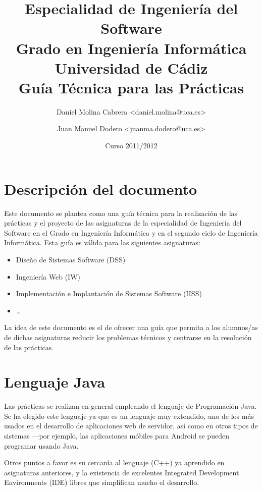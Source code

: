 \documentclass[11pt]{article}
\title{Especialidad de Ingeniería del Software\\
Grado en Ingeniería Informática\\
Universidad de Cádiz\\
\textbf{Guía Técnica para las Prácticas}}
\author{Daniel Molina Cabrera <daniel.molina@uca.es> \and Juan Manuel Dodero <juanma.dodero@uca.es>}
\date{Curso 2011/2012}
\begin{document}
\maketitle


\setcounter{tocdepth}{2}
\tableofcontents
\vspace*{1cm}
\newpage
\setlength{\parindent}{0pt}
\setlength{\parskip}{1ex plus 0.5ex minus 0.2ex}


\section{Descripción del documento}
\label{sec-1}




Este documento se plantea como una guía técnica para la realización de las prácticas y el proyecto de las asignaturas de la especialidad de Ingeniería del Software en el Grado en Ingeniería Informática y en el segundo ciclo de Ingeniería Informática. Esta guía es válida para las siguientes asignaturas:

\begin{itemize}
   \item Diseño de Sistemas Software (DSS)
   \item Ingeniería Web (IW)
   \item Implementación e Implantación de Sistemas Software (IISS)
   \item \ldots
\end{itemize}

La idea de este documento es el de ofrecer una guía que permita a los alumnos/as de dichas asignaturas reducir los problemas técnicos y centrarse en la resolución de las prácticas.


\section{Lenguaje Java}
\label{sec-2}

Las prácticas se realizan en general empleando el lenguaje de Programación Java. Se ha elegido este lenguaje ya que es un lenguaje muy extendido, uno de los más usados en el desarrollo de aplicaciones web de servidor, así como en otros tipos de sistemas ---por ejemplo, las aplicaciones móbiles para Android se pueden programar usando Java.

Otros puntos a favor es su cercanía al lenguaje (C++) ya aprendido en asignaturas anteriores, y la existencia de excelentes Integrated Development Environments (IDE) libres que simplifican mucho el desarrollo.
\end{document}
